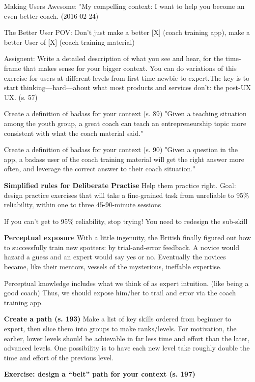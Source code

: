 Making Users Awesome: "My compelling context: I want to help you become an even better coach. (2016-02-24)

The Better User POV:
Don’t just make a better [X] (coach training app),
make a better User of [X] (coach training material)

Assignent:
Write a detailed description of what you see and hear, for the time-frame that makes sense for your bigger context.
You can do variations of this exercise for users at different levels from first-time newbie to expert.The key is to start thinking—hard—about what most products and services don’t: the post-UX UX. (s. 57)

Create a definition of badass for your context (s. 89)
"Given a teaching situation among the youth group, a great coach can teach an entrepreneurship topic more consistent with what the coach material said."

Create a definition of badass for your context (s. 90)
"Given a question in the app, a badass user of the coach training material will get the right answer more often, and leverage the correct answer to their coach situation."

\textbf{Simplified rules for Deliberate Practise}
Help them practice right. Goal: design practice exercises that will take a fine-grained task from unreliable to 95\% reliability, within one to three 45-90-minute sessions

If you can’t get to 95\% reliability, stop trying! You need to redesign the sub-skill

\textbf{Perceptual exposure}
With a little ingenuity, the British finally figured out how to successfully train new spotters: by trial-and-error feedback. A novice would hazard a guess and an expert would say yes or no. Eventually the novices became, like their mentors, vessels of the mysterious, ineffable expertise.

Perceptual knowledge includes what we think of as expert intuition. (like being a good coach) Thus, we should expose him/her to trail and error via the coach training app.

\textbf{Create a path (s. 193)}
Make a list of key skills ordered from beginner to expert, then slice them into groups to make ranks/levels. For motivation, the earlier, lower levels should be achievable in far less time and effort than the later, advanced levels. One possibility is to have each new level take roughly double the time and effort of the previous level.

\textbf{Exercise: design a “belt” path for your context (s. 197)}

